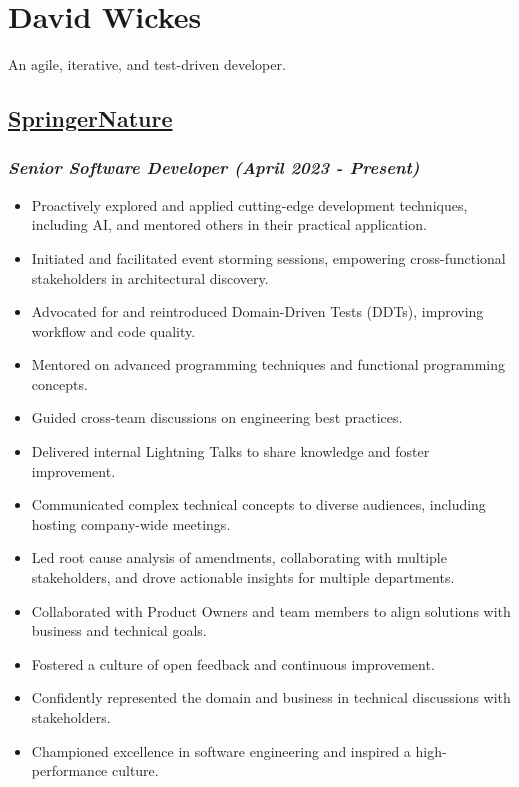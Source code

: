 \section{David Wickes}\label{david-wickes}

An agile, iterative, and test-driven developer.

\subsection{\texorpdfstring{\href{http://www.springernature.com}{SpringerNature}}{SpringerNature}}\label{springernature-2023}

\subsubsection{\texorpdfstring{\emph{Senior Software Developer (April
2023 -
Present)}}{Senior Software Developer (April 2023 - Present)}}\label{senior-software-developer-april-2023-present}

\begin{itemize}
\tightlist
\item
  Proactively explored and applied cutting-edge development techniques,
  including AI, and mentored others in their practical application.
\item
  Initiated and facilitated event storming sessions, empowering
  cross-functional stakeholders in architectural discovery.
\item
  Advocated for and reintroduced Domain-Driven Tests (DDTs), improving
  workflow and code quality.
\item
  Mentored on advanced programming techniques and functional programming
  concepts.
\item
  Guided cross-team discussions on engineering best practices.
\item
  Delivered internal \textquotesingle Lightning Talks\textquotesingle{}
  to share knowledge and foster improvement.
\item
  Communicated complex technical concepts to diverse audiences,
  including hosting company-wide meetings.
\item
  Led root cause analysis of amendments, collaborating with multiple
  stakeholders, and drove actionable insights for multiple departments.
\item
  Collaborated with Product Owners and team members to align solutions
  with business and technical goals.
\item
  Fostered a culture of open feedback and continuous improvement.
\item
  Confidently represented the domain and business in technical
  discussions with stakeholders.
\item
  Championed excellence in software engineering and inspired a
  high-performance culture.
\end{itemize}

